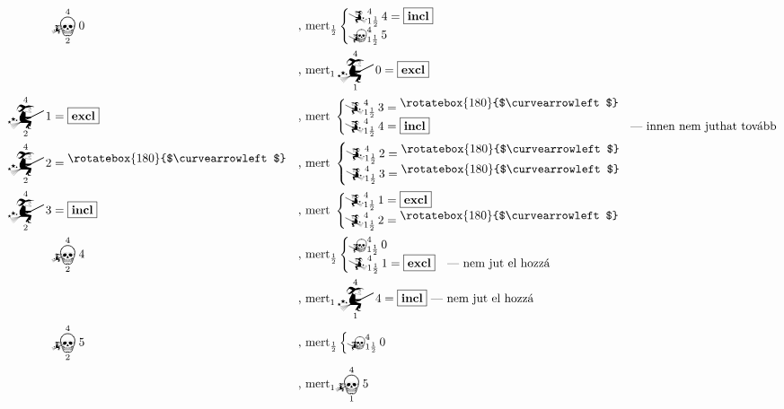 \documentclass{article}
\newcommand{\nothing}{\text{\raisebox{0.4em}{\rotatebox{180}{$\curvearrowleft$}}}}%
\newcommand{\just}[1]{\boxed{#1}}%
\newcommand{\incl}{\mathbf{incl}}
\newcommand{\excl}{\mathbf{excl}}
\newcommand{\mainfunA}[3]{\mathwitch_{#2}^{#1}#3}
\newcommand{\mainfunB}[3]{\reversemathwitch_{#2}^{#1}#3}
\newcommand{\nomainfunA}[3]{{}_{\mathwitch}\!\!\!\!\bigskull^{#1}_{#2}#3}
\newcommand{\nomainfunB}[3]{{}_{\reversemathwitch}\!\!\!\!\bigskull^{#1}_{#2}#3}
\begin{document}
	\begin{align*}
		&\nomainfunA420               &&\text{, mert}_\frac12\begin{cases}\mainfunB4{1\frac12}4=\just\incl\\\nomainfunB4{1\frac12}5\end{cases}\\
		&                            &&\text{, mert}_1\mainfunA410=\just\excl\\
		\mainfunA421   &= \just\excl  &&\text{, mert }\begin{cases}\mainfunB4{1\frac12}3 = \nothing\\\mainfunB4{1\frac12}4 = \just\incl&\text{--- innen nem juthat tovább}\end{cases}\\
		\mainfunA422   &= \nothing    &&\text{, mert }\begin{cases}\mainfunB4{1\frac12}2 = \nothing\\\mainfunB4{1\frac12}3 = \nothing&\end{cases}\\
		\mainfunA423   &= \just\incl  &&\text{, mert }\begin{cases}\mainfunB4{1\frac12}1 = \just\excl\\\mainfunB4{1\frac12}2 = \nothing&\end{cases}\\
		&\nomainfunA424               &&\text{, mert}_\frac12\begin{cases}\nomainfunB4{1\frac12}0\\\mainfunB4{1\frac12}1 = \just\excl&\text{--- nem jut el hozzá}\end{cases}\\
		&                            &&\text{, mert}_1\mainfunA414=\just\incl\text{ --- nem jut el hozzá}\\
		&\nomainfunA425               &&\text{, mert}_\frac12\begin{cases}\nomainfunB4{1\frac12}0\end{cases}\\
		&                            &&\text{, mert}_1\nomainfunA415
	\end{align*}
\end{document}
